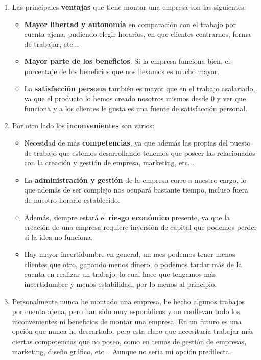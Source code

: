 \begin{enumerate}[label={\alph*}]
    \item Las principales \textbf{ventajas} que tiene montar una empresa son las siguientes:
    \begin{itemize}
        \item \textbf{Mayor libertad y autonomía} en comparación con el trabajo por cuenta ajena, pudiendo elegir horarios, en que clientes centrarnos, forma de trabajar, etc...
        \item \textbf{Mayor parte de los beneficios}. Si la empresa funciona bien, el porcentaje de los beneficios que nos llevamos es mucho mayor.
        \item La \textbf{satisfacción persona} también es mayor que en el trabajo asalariado, ya que el producto lo hemos creado nosotros mismos desde 0 y ver que funciona y a los clientes le gusta es una fuente de satisfacción personal.
    \end{itemize}
    \item Por otro lado los \textbf{inconvenientes} son varios:
    \begin{itemize}
        \item Necesidad de más \textbf{competencias}, ya que además las propias del puesto de trabajo que estemos desarrollando tenemos que poseer las relacionados con la creación y gestión de empresa, marketing, etc...
        \item La \textbf{administración y gestión} de la empresa corre a nuestro cargo, lo que además de ser complejo nos ocupará bastante tiempo, incluso fuera de nuestro horario establecido.
        \item Además, siempre estará el \textbf{riesgo económico} presente, ya que la creación de una empresa requiere inversión de capital que podemos perder si la idea no funciona.
        \item Hay mayor {incertidumbre} en general, un mes podemos tener menos clientes que otro, ganando menos dinero, o podemos tardar más de la cuenta en realizar un trabajo, lo cual hace que tengamos más incertidumbre y menos estabilidad, por lo menos al principio.
    \end{itemize}
    \item Personalmente nunca he montado una empresa, he hecho algunos trabajos por cuenta ajena, pero han sido muy esporádicos y no conllevan todo los inconvenientes ni beneficios de montar una empresa. En un futuro es una opción que nunca he descartado, pero esta claro que necesitaría trabajar más ciertas competencias que no poseo, como en temas de gestión de empresas, marketing, diseño gráfico, etc... Aunque no sería mi opción predilecta.
\end{enumerate}











\newpage



